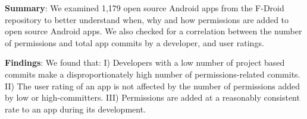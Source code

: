 \documentclass{sig-alternate-05-2015}
\newcommand{\todo}[1]{\textcolor{cyan}{\textbf{[#1]}}}
\begin{document}


\noindent \textbf{Summary}:
We examined 1,179 open source Android apps from the F-Droid repository to better understand when, why and how permissions are added to open source Android apps. We also checked for a correlation between the number of permissions and total app commits by a developer, and user ratings.

\noindent \textbf{Findings}:
We found that: I) Developers with a low number of project based commits make a disproportionately high number of permissions-related commits. II) The user rating of an app is not affected by the number of permissions added by low or high-committers. III) Permissions are added at a reasonably consistent rate to an app during its development.



\newpage
\balance



\end{document}
